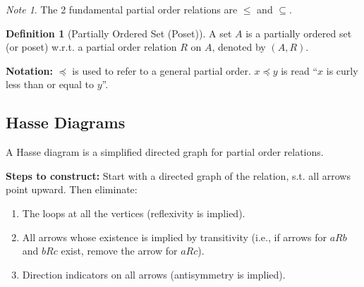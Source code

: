 \documentclass{article}
\theoremstyle{plain}
\theoremstyle{definition}
\newtheorem*{definition}{Definition}
\theoremstyle{remark}
\newtheorem*{note}{Note}
\begin{document}
\begin{note}
    The 2 fundamental partial order relations are $\leq$ and $\subseteq$.
\end{note}

\begin{definition}[Partially Ordered Set (Poset)]
    A set $A$ is a partially ordered set (or poset) w.r.t. a partial order relation $R$ on $A$, denoted by $(A, R)$.
\end{definition}
\textbf{Notation:} $\preceq$ is used to refer to a general partial order. $x \preceq y$ is read ``$x$ is curly less than or equal to $y$''.

\subsection{Hasse Diagrams}
A Hasse diagram is a simplified directed graph for partial order relations.

\textbf{Steps to construct:}
Start with a directed graph of the relation, s.t. all arrows point upward. Then eliminate:
\begin{enumerate}[label=\arabic*.]
    \item The loops at all the vertices (reflexivity is implied).
    \item All arrows whose existence is implied by transitivity (i.e., if arrows for $aRb$ and $bRc$ exist, remove the arrow for $aRc$).
    \item Direction indicators on all arrows (antisymmetry is implied).
\end{enumerate}
\end{document}
